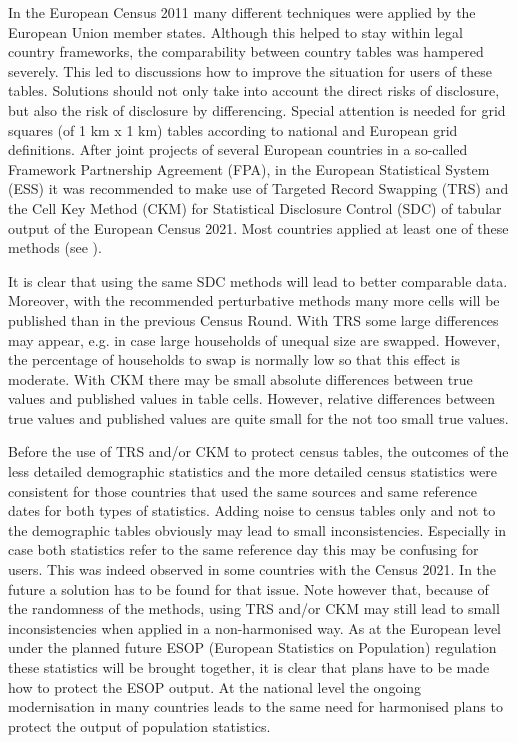 In the European Census 2011 many different techniques were applied by the European Union member states. Although this helped to stay within legal country frameworks, the comparability between country tables was hampered severely. This led to discussions how to improve the situation for users of these tables. Solutions should not only take into account the direct risks of disclosure, but also the risk of disclosure by differencing. Special attention is needed for grid squares (of 1 km x 1 km) tables according to national and European grid definitions. After joint projects of several European countries in a so-called Framework Partnership Agreement (FPA), in the European Statistical System (ESS) it was recommended to make use of Targeted Record Swapping (TRS) and the Cell Key Method (CKM) for Statistical Disclosure Control (SDC) of tabular output of the European Census 2021. Most countries applied at least one of these methods (see \cite{censusmethodsUNECE}).


It is clear that using the same SDC methods will lead to better comparable data. Moreover, with the recommended perturbative methods many more cells will be published than in the previous Census Round. With TRS some large differences may appear, e.g. in case large households of unequal size are swapped. However, the percentage of households to swap is normally low so that this effect is moderate. With CKM there may be small absolute differences between true values and published values in table cells. However, relative differences between true values and published values are quite small for the not too small true values.

Before the use of TRS and/or CKM to protect census tables, the outcomes of the less detailed demographic statistics and the more detailed census statistics were consistent for those countries that used the same sources and same reference dates for both types of statistics. Adding noise to census tables only and not to the demographic tables obviously may lead to small inconsistencies. Especially in case both statistics refer to the same reference day this may be confusing for users.
This was indeed observed in some countries with the Census 2021. In the future a solution has to be found for that issue. Note however that, because of the randomness of the methods, using TRS and/or CKM may still lead to small inconsistencies when applied in a non-harmonised way.
As at the European level under the planned future ESOP (European Statistics on Population) regulation these statistics will be brought together, it is clear that plans have to be made how to protect the ESOP output. At the national level the ongoing modernisation in many countries leads to the same need for harmonised plans to protect the output of population statistics.


